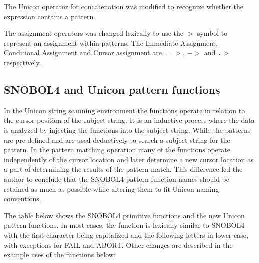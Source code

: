 \documentclass{article}
\begin{document}
The Unicon operator for concatenation was modified to recognize whether the expression contains a pattern.

The assignment operators was changed lexically to use the \texttt{$>$} symbol to represent an assignment within patterns.  The Immediate Assignment, Conditional Assignment and Cursor assignment are \texttt{$=>$}, \texttt{$->$} and \texttt{.$>$} respectively.

\vspace{1 pc}
\subsection{SNOBOL4 and Unicon pattern functions}

In the Unicon string scanning environment the functions operate in relation to the cursor position of the subject string.  It is an inductive process where the data is analyzed by injecting the functions into the subject string.  While the patterns are pre-defined and are used deductively to search a subject string for the pattern.  In the pattern matching operation many of the functions operate independently of the cursor location and later determine a new cursor location as a part of determining the results of the pattern match.  This difference led the author to conclude that the SNOBOL4 pattern function names should be retained as much as possible while altering them to fit Unicon naming conventions.  

The table below shows the SNOBOL4 primitive functions and the new Unicon pattern functions.  In most cases, the function is lexically similar to SNOBOL4 with the first character being capitalized and the following letters in lower-case, with exceptions for FAIL and ABORT.  Other changes are described in the example uses of the functions below: 
\end{document}
